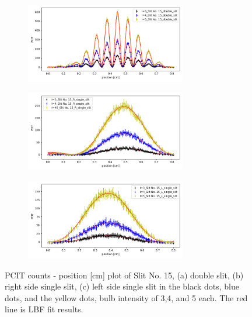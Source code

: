 \documentclass{article}
\begin{document}
\begin{figure}[H]
    \begin{subfigure}[b]{7cm}
        \centering
        \includegraphics[width=7cm]{../results/bulb(15_double_slit)_fig.png}
        \caption{}
    \end{subfigure}
    \hfill
    \begin{subfigure}[b]{7cm}
      \centering
      \includegraphics[width=7cm]{../results/bulb(15_R_single_slit)_fig.png}
      \caption{}
  \end{subfigure}
  \hfill
  \centering
  \begin{subfigure}[b]{7cm}
    \centering
    \includegraphics[width=7cm]{../results/bulb(15_L_single_slit)_fig.png}
    \caption{}
  \end{subfigure}
  \hfill
    \caption{PCIT counts - position [cm] plot of Slit No. 15, (a) double slit, (b) right side single slit, (c) left side single slit in the black dots, blue dots, and the yellow dots, bulb intensity of 3,4, and 5 each.
        The red line is LBF fit results.
     }
    \label{fig: 15_bulb_plot}
  \end{figure}
\end{document}
